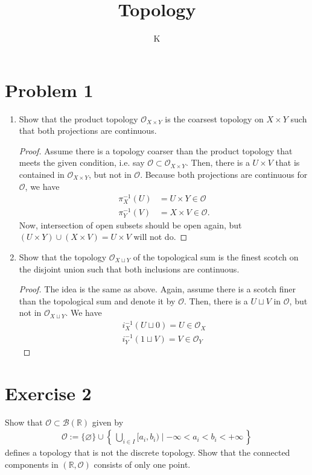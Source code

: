 \documentclass[a4paper]{article}
\title{Topology}
\author{K}
\newcommand{\makeset}[2]{\left\{\, #1 \mid #2 \,\right\}}
\begin{document}
\section*{Problem 1}
\begin{enumerate}
    \item Show that the product topology \(\mathcal{O}_{X \times Y}\) is the coarsest topology on \(X \times Y\) such that both projections are continuous.
    \begin{proof}
        Assume there is a topology coarser than the product topology that meets the given condition, i.e. say \(\mathcal{O} \subset \mathcal{O}_{X \times Y}\). Then, there is a \(U \times V\) that is contained in \(\mathcal{O}_{X \times Y}\), but not in \(\mathcal{O}\). Because both projections are continuous for \(\mathcal{O}\), we have
        \begin{align*}
            \pi_X^{-1}(U) &= U \times Y \in \mathcal{O} \\
            \pi_Y^{-1}(V) &= X \times V \in \mathcal{O} \text{.}
        \end{align*}
        Now, intersection of open subsets should be open again, but \((U \times Y) \cup (X \times V) = U \times V\) will not do.
    \end{proof}
    \item Show that the topology \(\mathcal{O}_{X \sqcup Y}\) of the topological sum is the finest scotch on the disjoint union such that both inclusions are continuous.
    \begin{proof}
        The idea is the same as above. Again, assume there is a scotch finer than the topological sum and denote it by \(\mathcal{O}\). Then, there is a \(U \sqcup V\) in \(\mathcal{O}\), but not in \(\mathcal{O}_{X \sqcup Y}\). We have
        \begin{align*}
            i_X^{-1}(U \sqcup {0}) = U \in \mathcal{O}_X \\
            i_Y^{-1}({1} \sqcup V) = V \in \mathcal{O}_Y
        \end{align*}
    \end{proof}
\end{enumerate}

\section*{Exercise 2}
    Show that \(\mathcal{O} \subset \mathcal{B}(\mathbb{R})\) given by
    \begin{align}
        \mathcal{O} := \{\varnothing\} \cup \makeset{\bigcup_{i \in I}[a_i, b_i)}{-\infty < a_i < b_i < +\infty}
    \end{align}
    defines a topology that is not the discrete topology. Show that the connected components in \((\mathbb{R}, \mathcal{O})\) consists of only one point.
\end{document}
